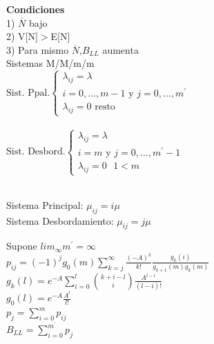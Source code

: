 \begin{minipage}{.22\textwidth}
	{\bf Condiciones} \\
	1) $\overline{N}$ bajo \\
	2) V[N]$>$E[N] \\
	3) Para mismo $\overline{N}$,$B_{LL}$ aumenta \\
	Sistemas M/M/m/m \\
	$\text{Sist. Ppal.}\left \{  \begin{matrix} \lambda_{ij}=\lambda               \\
			i=0,...,m-1\text{ y }j=0,...,m^{'} \\
			\lambda_{ij}=0 \text{  resto}\end{matrix}  \right .$ \\ \\
	$\text{Sist. Desbord.}\left \{  \begin{matrix} \lambda_{ij}=\lambda         \\
			i=m\text{ y }j=0,...,m^{'}-1 \\
			\lambda_{ij}=0 \text{  }1<m\end{matrix}  \right .$ \\ \\
\end{minipage}

\vfill\null
\columnbreak
\begin{minipage}{.22\textwidth}
	Sistema Principal: $\mu_{ij}=i\mu$ \\
	Sistema Desbordamiento: $\mu_{ij}=j\mu$ \\
\end{minipage}

\begin{minipage}{.22\textwidth}
	Supone $lim_\infty{m^{'}}=\infty$ \\
	$p_{ij}=(-1)^j{g_0(m)}\sum\limits_{k=j}^{\infty}\frac{(-A)^k}{k!}\frac{g_k(i)}{g_{k+1}(m)g_k(m)}$ \\
	$g_k(l)=e^{-A}\sum_{i=0}^l{\binom{k+i-l}{i}}\frac{A^{l-i}}{(l-i)!}$ \\
	$g_0(l)=e^{-A}\frac{A^l}{l!}$ \\
	$p_j=\sum_{i=0}^m{p_{ij}}$ \\
	$B_{LL}=\sum_{i=0}^{m^{'}}{p_{j}}$ \\
\end{minipage}

